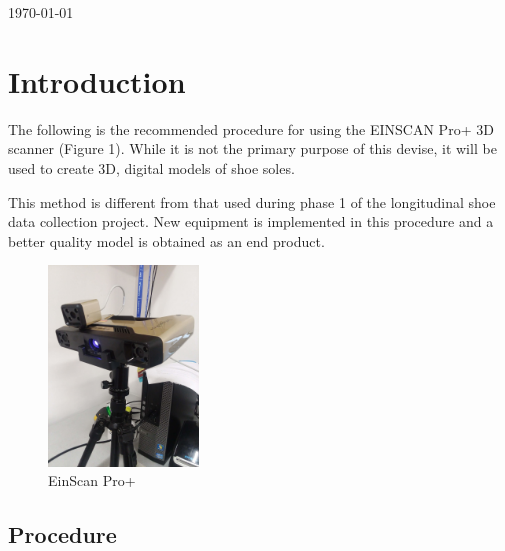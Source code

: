 \begin{titlepage}
\begin{center}
\begin{tabular}{ c   |   c } 
 
\end{tabular}
\end{center}

{\large \today}\\[2cm] %



\vfill %

\end{titlepage}




\section{Introduction}

The following is the recommended procedure for using the EINSCAN Pro+ 3D scanner (Figure 1). While it is not the primary purpose of this devise, it will be used to create 3D, digital models of shoe soles. 

This method is different from that used during phase 1 of the longitudinal shoe data collection project. New equipment is implemented in this procedure and a better quality model is obtained as an end product. 

\begin{figure}[!htp]
\centering
\includegraphics[width=4cm]{Scanner}
\caption{EinScan Pro+}
\label{Image 1}
\end{figure}


\subsection{Procedure}

